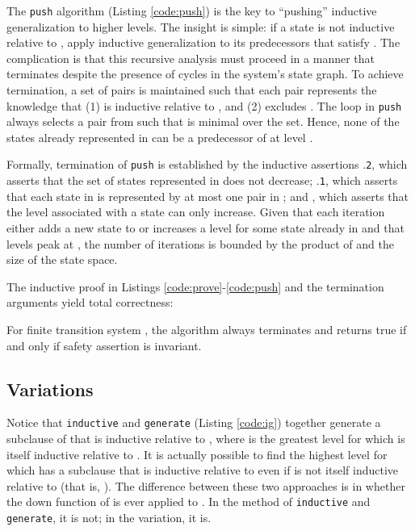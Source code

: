 \documentclass{llncs}
\begin{document}
The {\tt push} algorithm (Listing \ref{code:push}) is the key to
``pushing'' inductive generalization to higher levels.  The insight is
simple: if a state  is not inductive relative to , apply
inductive generalization to its predecessors that satisfy .
The complication is that this recursive analysis must proceed in a
manner that terminates despite the presence of cycles in the system's
state graph.  To achieve termination, a set  of pairs  is maintained such that each pair  represents
the knowledge that (1)  is inductive relative to , and (2)
 excludes .  The loop in {\tt push} always selects a pair
 from  such that  is minimal over the set.
Hence, none of the states already represented in  can be a
predecessor of  at level .

Formally, termination of {\tt push} is established by the inductive
assertions .{\tt 2}, which asserts that the set of states
represented in  does not decrease; .{\tt 1}, which
asserts that each state in  is represented by at most one
pair in ; and , which asserts that the level associated
with a state can only increase.  Given that each iteration either adds
a new state to  or increases a level for some state already
in  and that levels peak at , the number of iterations
is bounded by the product of  and the size of the state space.

The inductive proof in Listings \ref{code:prove}-\ref{code:push} and
the termination arguments yield total correctness:

\begin{theorem} 
\label{th:correct}
For finite transition system , the algorithm always
terminates and returns true if and only if safety assertion  is
invariant.
\end{theorem}

\subsection{Variations}

Notice that {\tt inductive} and {\tt generate} (Listing \ref{code:ig})
together generate a subclause of  that is inductive relative
to , where  is the greatest level for which  is
itself inductive relative to .  It is actually possible to find
the highest level  for which  has a subclause that
is inductive relative to  even if  is not itself
inductive relative to  (that is, ).  The difference
between these two approaches is in whether the {\sf down} function of
\cite{Bradley+Manna/2007} is ever applied to .  In the method
of {\tt inductive} and {\tt generate}, it is not; in the variation, it
is.
\end{document}
